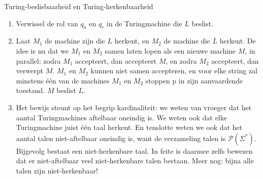 \begin{prf}{Turing-beslisbaarheid en Turing-herkenbaarheid}
    \begin{enumerate}
        \item 
            Verwissel de rol van $q_a$ en $q_r$ in de Turingmachine die $L$ beslist.
        \item 
            Laat $M_1$ de machine zijn die $L$ herkent, en $M_2$ de machine die $\overline{L}$ herkent. De idee is nu dat we $M_1$ en $M_2$ samen laten lopen als een nieuwe machine $M$, in parallel: zodra $M_1$ accepteert, dan accepteert $M$, en zodra $M_2$ accepteert, dan verwerpt $M$. $M_1$ en $M_2$ kunnen niet samen accepteren, en voor elke string zal minstens één van de machines $M_1$ en $M_2$ stoppen p in zijn aanvaardende toestand. $M$ beslist $L$.
        \item 
            Het bewijs steunt op het begrip kardinaliteit: we weten van vroeger dat het aantal Turingmachines aftelbaar oneindig is. We weten ook dat elke Turingmachine juist één taal herkent. En tenslotte weten we ook dat het aantal talen niet-aftelbaar oneindig is, want de verzameling talen is $\mathcal{P}(\Sigma^*)$. Bijgevolg bestaat een niet-herkenbare taal. In feite is daarmee zelfs bewezen dat er niet-aftelbaar veel niet-herkenbare talen bestaan. Meer nog: bijna alle talen zijn niet-herkenbaar!
    \end{enumerate}
\end{prf}